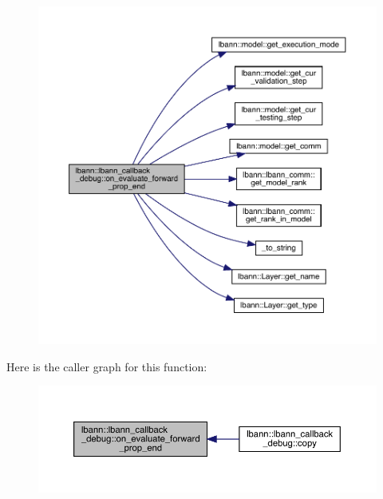 \begin{figure}[H]
\begin{center}
\leavevmode
\includegraphics[width=350pt]{classlbann_1_1lbann__callback__debug_a19639823e288e7599947c0abfaa6d1f4_cgraph}
\end{center}
\end{figure}
Here is the caller graph for this function\+:\nopagebreak
\begin{figure}[H]
\begin{center}
\leavevmode
\includegraphics[width=350pt]{classlbann_1_1lbann__callback__debug_a19639823e288e7599947c0abfaa6d1f4_icgraph}
\end{center}
\end{figure}
\mbox{\label{classlbann_1_1lbann__callback__debug_ac3e88ef582a7e3949b6e016ca2b17459}} 
